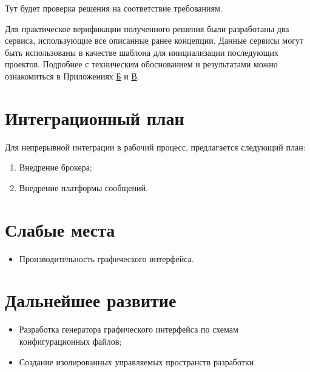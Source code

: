 \documentclass[../thesis.tex]{subfiles}
\begin{document}
	Тут будет проверка решения на соответствие требованиям.

	Для практическое верификации полученного решения были разработаны два сервиса, использующие все
	описанные ранее концепции. Данные сервисы могут быть использованы в качестве шаблона для инициализации
	последующих проектов. Подробнее с техническим обоснованием и результатами можно ознакомиться в
	Приложениях \hyperref[apx:2]{Б} и \hyperref[apx:3]{В}.

	\section{Интеграционный план}

	Для непрерывной интеграции в рабочий процесс, предлагается следующий план:

	\begin{enumerate}
		\item Внедрение брокера;

		\item Внедрение платформы сообщений.
	\end{enumerate}

	\section{Слабые места}

	\begin{itemize}
		\item Производительность графического интерфейса.
	\end{itemize}

	\section{Дальнейшее развитие}

	\begin{itemize}
		\item Разработка генератора графического интерфейса по схемам конфигурационных файлов;

		\item Создание изолированных управляемых пространств разработки.
	\end{itemize}
\end{document}
